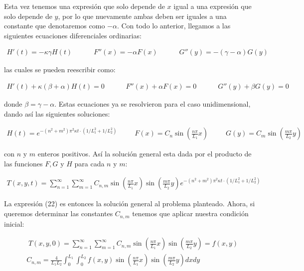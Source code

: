 \documentclass[12pt]{article}
\begin{document}
Esta vez tenemos una expresión que solo depende de $x$ igual a una expresión que solo depende de $y$, por lo que nuevamente ambas deben ser iguales a una constante que denotaremos como $-\alpha$. Con todo lo anterior, llegamos a las siguientes ecuaciones diferenciales ordinarias:

\begin{align*}
    H'(t) = -\kappa\gamma H(t) \;\;\;\;\;\;\;\;\;\;\; F''(x) = -\alpha F(x) \;\;\;\;\;\;\;\;\;\;\; G''(y) = -(\gamma-\alpha) G(y)
\end{align*}

las cuales se pueden reescribir como:

\begin{align*}
    H'(t) + \kappa(\beta + \alpha) H(t)=0 \;\;\;\;\;\;\;\;\;\;\; F''(x) + \alpha F(x)=0 \;\;\;\;\;\;\;\;\;\;\; G''(y) + \beta G(y) = 0
\end{align*}

donde $\beta = \gamma-\alpha$. Estas ecuaciones ya se resolvieron para el caso unidimensional, dando así las siguientes soluciones:

\begin{align*}
    H(t)=e^{-(n^2+m^2)\pi^2\kappa t\cdot(1/L_1^2 + 1/L_2^2)} \;\;\;\;\;\;\;\;\; F(x)=C_n \sin \left(\frac{n\pi}{L_1}x\right) \;\;\;\;\;\;\;\;\; G(y) = C_m \sin \left(\frac{m\pi}{L_2}y\right)
\end{align*}

con $n$ y $m$ enteros positivos. Así la solución general esta dada por el producto de las funciones $F, G$ y $H$ para cada $n$ y $m$:

\begin{align}
    T(x,y,t) = \sum_{n=1}^{\infty}\sum_{m=1}^{\infty} C_{n,m}\sin \left(\frac{n\pi}{L_1}x\right)\sin \left(\frac{m\pi}{L_2}y\right)e^{-(n^2+m^2)\pi^2\kappa t\cdot(1/L_1^2 + 1/L_2^2)}
\end{align}

La expresión (22) es entonces la solución general al problema planteado. Ahora, si queremos determinar las constantes $C_{n,m}$ tenemos que aplicar nuestra condición inicial:

\begin{align}
    \nonumber &\;T(x,y,0) = \sum_{n=1}^{\infty}\sum_{m=1}^{\infty} C_{n,m}\sin \left(\frac{n\pi}{L_1}x\right)\sin \left(\frac{m\pi}{L_2}y\right) = f(x,y) \\
    &C_{n,m} = \frac{4}{L_1L_2}\int_{0}^{L_1}\int_{0}^{L_2}f(x,y)\sin \left(\frac{n\pi}{L_1}x\right)\sin \left(\frac{m\pi}{L_2}y\right)dxdy
\end{align}
\end{document}
